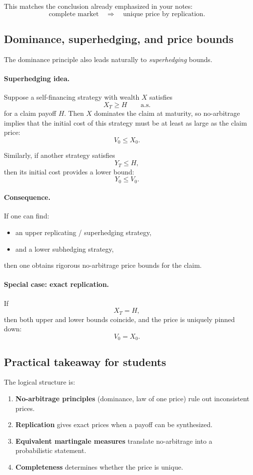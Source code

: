 \documentclass[11pt]{article}
\newcommand{\1}{\mathbf{1}}
\begin{document}
This matches the conclusion already emphasized in your notes:
$$
\text{complete market} \quad \Longrightarrow \quad \text{unique price by replication}.
$$

\subsection{Dominance, superhedging, and price bounds}

The dominance principle also leads naturally to \emph{superhedging} bounds.

\paragraph{Superhedging idea.}
Suppose a self-financing strategy with wealth \(X\) satisfies
$$
X_T \ge H
\qquad \text{a.s.}
$$
for a claim payoff \(H\).
Then \(X\) dominates the claim at maturity, so no-arbitrage implies that the initial cost of this strategy must be at least as large as the claim price:
$$
\boxed{\ V_0 \le X_0. \ }
$$

Similarly, if another strategy satisfies
$$
Y_T \le H,
$$
then its initial cost provides a lower bound:
$$
\boxed{\ Y_0 \le V_0. \ }
$$

\paragraph{Consequence.}
If one can find:
\begin{itemize}[leftmargin=1.4em]
    \item an upper replicating / superhedging strategy,
    \item and a lower subhedging strategy,
\end{itemize}
then one obtains rigorous no-arbitrage price bounds for the claim.

\paragraph{Special case: exact replication.}
If
$$
X_T=H,
$$
then both upper and lower bounds coincide, and the price is uniquely pinned down:
$$
V_0=X_0.
$$

\subsection{Practical takeaway for students}

The logical structure is:

\begin{enumerate}[leftmargin=1.6em]
    \item \textbf{No-arbitrage principles} (dominance, law of one price) rule out inconsistent prices.
    \item \textbf{Replication} gives exact prices when a payoff can be synthesized.
    \item \textbf{Equivalent martingale measures} translate no-arbitrage into a probabilistic statement.
    \item \textbf{Completeness} determines whether the price is unique.
\end{enumerate}
\end{document}
